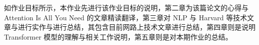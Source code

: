 \begin{cabstract}
如作业目标所示，本作业先进行该作业目标的说明，第二章为该篇论文的心得与 Attention Is All You Need 的文章精读翻译，第三章对 NLP 与 Harvard 等技术文章与进行实作与进行总结，其包含目前网路上技术文章进行总结，第四章则是说明 Transformer 模型的理解与相关工作说明，第五章则是对本期作业的总结。

\end{cabstract}


